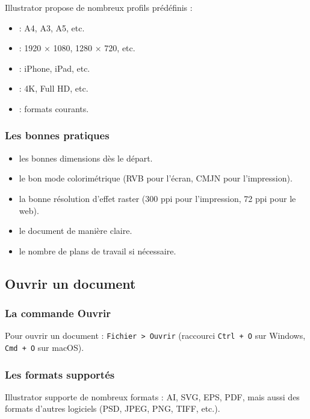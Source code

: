 Illustrator propose de nombreux profils prédéfinis :

\begin{itemize}
    \item {} : A4, A3, A5, etc.
    \item {} : 1920 × 1080, 1280 × 720, etc.
    \item {} : iPhone, iPad, etc.
    \item {} : 4K, Full HD, etc.
    \item {} : formats courants.
\end{itemize}

\subsubsection{Les bonnes pratiques}

\begin{itemize}
    \item {} les bonnes dimensions dès le départ.
    \item {} le bon mode colorimétrique (RVB pour l'écran, CMJN pour l'impression).
    \item {} la bonne résolution d'effet raster (300 ppi pour l'impression, 72 ppi pour le web).
    \item {} le document de manière claire.
    \item {} le nombre de plans de travail si nécessaire.
\end{itemize}

\subsection{Ouvrir un document}

\subsubsection{La commande Ouvrir}

Pour ouvrir un document : \texttt{Fichier > Ouvrir} (raccourci \texttt{Ctrl + O} sur Windows, \texttt{Cmd + O} sur macOS).

\subsubsection{Les formats supportés}

Illustrator supporte de nombreux formats : AI, SVG, EPS, PDF, mais aussi des formats d'autres logiciels (PSD, JPEG, PNG, TIFF, etc.).

